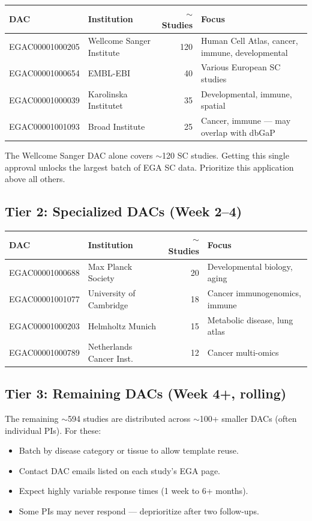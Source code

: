 \documentclass[11pt,letterpaper]{article}
\begin{document}
\begin{longtable}{@{} l l r p{4.5cm} @{}}
\toprule
\textbf{DAC} & \textbf{Institution} & \textbf{$\sim$Studies} & \textbf{Focus} \\
\midrule
\endhead
EGAC00001000205 & Wellcome Sanger Institute & 120 &
    Human Cell Atlas, cancer, immune, developmental \\
EGAC00001000654 & EMBL-EBI & 40 &
    Various European SC studies \\
EGAC00001000039 & Karolinska Institutet & 35 &
    Developmental, immune, spatial \\
EGAC00001001093 & Broad Institute & 25 &
    Cancer, immune --- may overlap with dbGaP \\
\bottomrule
\end{longtable}

\begin{notebox}
The Wellcome Sanger DAC alone covers $\sim$120 SC studies. Getting
this single approval unlocks the largest batch of EGA SC data.
Prioritize this application above all others.
\end{notebox}

\subsection{Tier 2: Specialized DACs (Week 2--4)}

\begin{longtable}{@{} l l r p{4.5cm} @{}}
\toprule
\textbf{DAC} & \textbf{Institution} & \textbf{$\sim$Studies} & \textbf{Focus} \\
\midrule
\endhead
EGAC00001000688 & Max Planck Society & 20 &
    Developmental biology, aging \\
EGAC00001001077 & University of Cambridge & 18 &
    Cancer immunogenomics, immune \\
EGAC00001000203 & Helmholtz Munich & 15 &
    Metabolic disease, lung atlas \\
EGAC00001000789 & Netherlands Cancer Inst. & 12 &
    Cancer multi-omics \\
\bottomrule
\end{longtable}

\subsection{Tier 3: Remaining DACs (Week 4+, rolling)}

The remaining $\sim$594 studies are distributed across $\sim$100+
smaller DACs (often individual PIs). For these:
\begin{itemize}[nosep]
    \item Batch by disease category or tissue to allow template reuse.
    \item Contact DAC emails listed on each study's EGA page.
    \item Expect highly variable response times (1 week to 6+ months).
    \item Some PIs may never respond --- deprioritize after two
          follow-ups.
\end{itemize}
\end{document}
